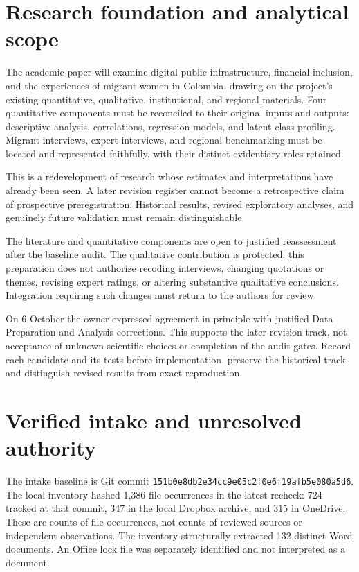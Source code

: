 \documentclass[11pt,a4paper]{article}
\begin{document}
\section{Research foundation and analytical scope}
The academic paper will examine digital public infrastructure, financial
inclusion, and the experiences of migrant women in Colombia, drawing on the
project's existing quantitative, qualitative, institutional, and regional
materials. Four quantitative components must be reconciled to their original
inputs and outputs: descriptive analysis, correlations, regression models, and
latent class profiling. Migrant interviews, expert interviews, and regional
benchmarking must be located and represented faithfully, with their distinct
evidentiary roles retained.

This is a redevelopment of research whose estimates and interpretations have
already been seen. A later revision register cannot become a retrospective
claim of prospective preregistration. Historical results, revised exploratory
analyses, and genuinely future validation must remain distinguishable.

The literature and quantitative components are open to justified reassessment
after the baseline audit. The qualitative contribution is protected: this
preparation does not authorize recoding interviews, changing quotations or
themes, revising expert ratings, or altering substantive qualitative conclusions.
Integration requiring such changes must return to the authors for review.

On 6 October the owner expressed agreement in principle with justified Data
Preparation and Analysis corrections. This supports the later revision track,
not acceptance of unknown scientific choices or completion of the audit gates.
Record each candidate and its tests before implementation, preserve the
historical track, and distinguish revised results from exact reproduction.

\section{Verified intake and unresolved authority}
The intake baseline is Git commit
\texttt{151b0e8db2e34cc9e05c2f0e6f19afb5e080a5d6}. The local inventory hashed
1,386 file occurrences in the latest recheck: 724 tracked at that commit, 347
in the local Dropbox archive, and 315 in OneDrive. These are counts of file
occurrences, not counts
of reviewed sources or independent observations. The inventory structurally
extracted 132 distinct Word documents. An Office lock file was separately
identified and not interpreted as a document.
\end{document}
